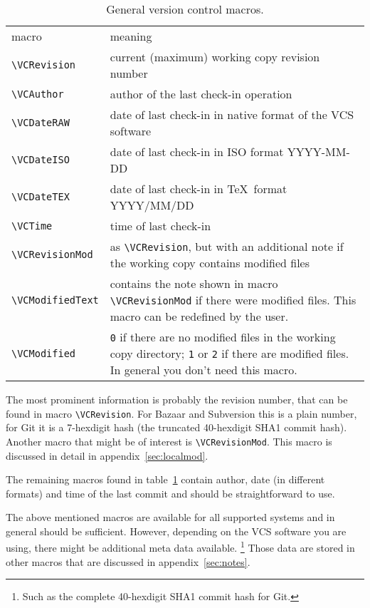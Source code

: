 \documentclass[11pt]{article}
\begin{document}
\begin{table}
  \centering\small
  \begin{tabularx}{\textwidth}{l>{\raggedright\arraybackslash}X}
    macro & meaning\\\addlinespace \toprule\addlinespace
    \verb+\VCRevision+    & current (maximum) working copy revision number\\
    \verb+\VCAuthor+      & author of the last check-in operation\\
    \verb+\VCDateRAW+     & date of last check-in in native format of the VCS software\\
    \verb+\VCDateISO+     & date of last check-in in ISO format YYYY-MM-DD\\
    \verb+\VCDateTEX+     & date of last check-in in \TeX\ format YYYY/MM/DD\\
    \verb+\VCTime+        & time of last check-in\\
    \verb+\VCRevisionMod+ & as \verb+\VCRevision+, but with an additional note if the working copy contains modified files\\
    \verb+\VCModifiedText+& contains the note shown in macro \verb+\VCRevisionMod+ if there were modified files.  This macro can be redefined by the user.\\
    \verb+\VCModified+    & \verb+0+ if there are no modified files in the working copy directory; \verb+1+ or \verb+2+ if there are modified files.  In general you don't need this macro.\\
  \end{tabularx}
  \caption{General version control macros.}
  \label{tab:vcmacros}
\end{table}

The most prominent information is probably the revision number, that can
be found in macro \verb+\VCRevision+.  For Bazaar and Subversion this is
a plain number, for Git it is a 7-hexdigit hash (the truncated
40-hexdigit SHA1 commit hash).  Another macro that might be of interest
is \verb+\VCRevisionMod+.  This macro is discussed in detail in
appendix~\ref{sec:localmod}.

The remaining macros found in table~\ref{tab:vcmacros} contain author,
date (in different formats) and time of the last commit and should be
straightforward to use.

The above mentioned macros are available for all supported systems and
in general should be sufficient.  However, depending on the VCS software
you are using, there might be additional meta data available.%
\footnote{Such as the complete 40-hexdigit SHA1 commit hash for Git.}
Those data are stored in other macros that are discussed in
appendix~\ref{sec:notes}.
\end{document}
